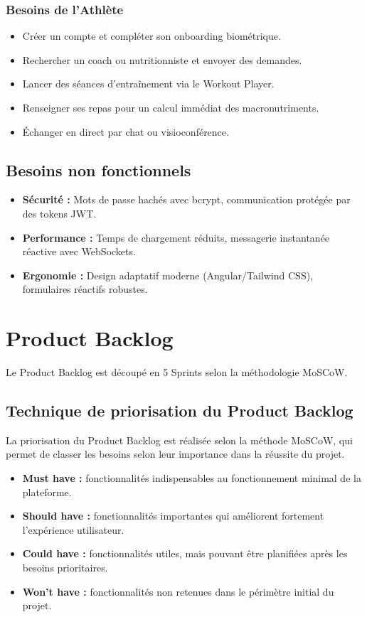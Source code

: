 \subsubsection{Besoins de l'Athlète}
\begin{itemize}
    \item Créer un compte et compléter son onboarding biométrique.
    \item Rechercher un coach ou nutritionniste et envoyer des demandes.
    \item Lancer des séances d'entraînement via le Workout Player.
    \item Renseigner ses repas pour un calcul immédiat des macronutriments.
    \item Échanger en direct par chat ou visioconférence.
\end{itemize}

\subsection{Besoins non fonctionnels}
\begin{itemize}
    \item \textbf{Sécurité :} Mots de passe hachés avec bcrypt, communication protégée par des tokens JWT.
    \item \textbf{Performance :} Temps de chargement réduits, messagerie instantanée réactive avec WebSockets.
    \item \textbf{Ergonomie :} Design adaptatif moderne (Angular/Tailwind CSS), formulaires réactifs robustes.
\end{itemize}

\section{Product Backlog}
Le Product Backlog est découpé en 5 Sprints selon la méthodologie MoSCoW.

\subsection{Technique de priorisation du Product Backlog}
La priorisation du Product Backlog est réalisée selon la méthode MoSCoW, qui permet de classer les besoins selon leur importance dans la réussite du projet.

\begin{itemize}
    \item \textbf{Must have :} fonctionnalités indispensables au fonctionnement minimal de la plateforme.
    \item \textbf{Should have :} fonctionnalités importantes qui améliorent fortement l'expérience utilisateur.
    \item \textbf{Could have :} fonctionnalités utiles, mais pouvant être planifiées après les besoins prioritaires.
    \item \textbf{Won't have :} fonctionnalités non retenues dans le périmètre initial du projet.
\end{itemize}

